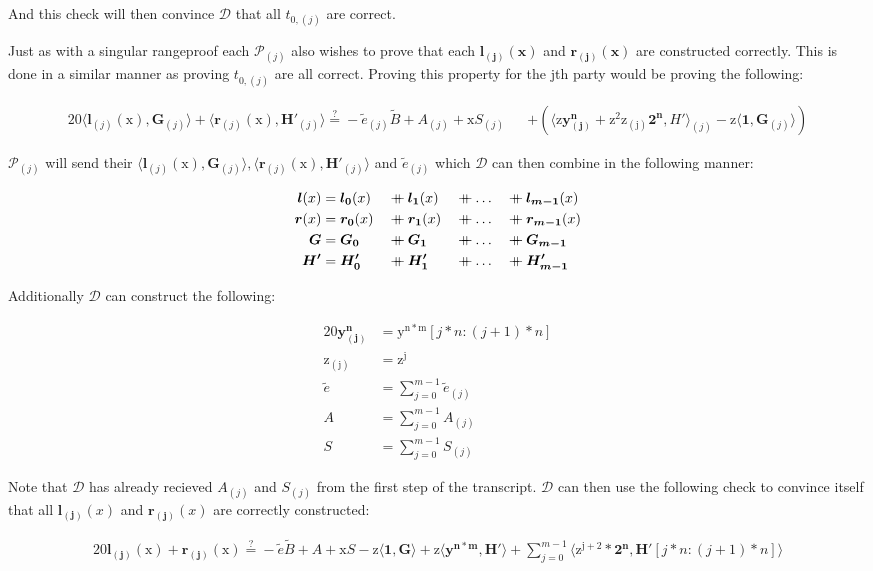 \documentclass{article}
\newcommand{\eq}[1]{\begin{alignat*}{20}#1\end{alignat*}}
\renewcommand{\vec}[1]{\boldsymbol{#1}}
\newcommand{\ran}[1]{\mathrm{#1}}
\newcommand{\vecran}[1]{\mathbf{#1}}
\renewcommand{\P}{\mathcal{P}}
\newcommand{\D}{\mathcal{D}}
\newcommand\concat{\mathbin{+\mkern-10mu+}} %
\newcommand{\dotp}[2]{\langle #1, #2 \rangle}
\begin{document}
And this check will then convince $\D$ that all $t_{0,(j)}$
are correct.

Just as with a singular rangeproof each $\P_{(j)}$ also wishes to prove
that each $\vec{l_{(j)}(x)}$ and $\vec{r_{(j)}(x)}$ are constructed
correctly. This is done in a similar manner as proving $t_{0,(j)}$
are all correct. Proving this property for the jth party would be
proving the following:

\eq{
	\dotp{\vec{l}_{(j)}(\ran{x})}{\vec{G}_{(j)}} + \dotp{\vec{r}_{(j)}(\ran{x})}{\vec{H'}_{(j)}} \stackrel{?}{=} -\widetilde{e}_{(j)}\widetilde{B} + A_{(j)} + \ran{x}S_{(j)} &&+ (\dotp{\ran{z}\vecran{y^n_{(j)}} + \ran{z^2}\ran{z_{(j)}}\vec{2^n}}{H'}_{(j)} - \ran{z}\dotp{\vec{1}}{\vec{G}_{(j)}})
}

$\P_{(j)}$ will send their $\dotp{\vec{l}_{(j)}(\ran{x})}{\vec{G}_{(j)}},
\dotp{\vec{r}_{(j)}(\ran{x})}{\vec{H'}_{(j)}}$ and $\widetilde{e}_{(j)}$
which $\D$ can then combine in the following manner:

\eq{
	\vec{l}(x) &= \vec{l_0}(x) &&\concat \vec{l_1}(x) &&\concat \dots &&\concat \vec{l_{m-1}}(x)\\
	\vec{r}(x) &= \vec{r_0}(x) &&\concat \vec{r_1}(x) &&\concat \dots &&\concat \vec{r_{m-1}}(x)\\
	\vec{G} &= \vec{G_0} &&\concat \vec{G_1} &&\concat \dots &&\concat \vec{G_{m-1}}\\
	\vec{H'} &= \vec{H'_0} &&\concat \vec{H'_1} &&\concat \dots &&\concat \vec{H'_{m-1}}
}

Additionally $\D$ can construct the following:

\eq{
	\vecran{y^n_{(j)}} &= \ran{y^{n*m}}[j*n : (j+1)*n]\\
	\ran{z_{(j)}} &= \ran{z^j}\\
	\widetilde{e} &= \sum^{m-1}_{j = 0} \widetilde{e}_{(j)}\\
	A &= \sum^{m-1}_{j = 0} A_{(j)}\\
	S &= \sum^{m-1}_{j = 0} S_{(j)}
}

Note that $\D$ has already recieved $A_{(j)}$ and $S_{(j)}$
from the first step of the transcript. $\D$ can then use the
following check to convince itself that all $\vec{l_{(j)}}(x)$ and
$\vec{r_{(j)}}(x)$ are correctly constructed:

\eq{
	\vec{l_{(j)}}(\ran{x}) + \vec{r_{(j)}}(\ran{x}) \stackrel{?}{=} -\widetilde{e}\widetilde{B} + A + \ran{x}S - \ran{z}\dotp{\vec{1}}{\vec{G}} + \ran{z}\dotp{\vecran{y^{n*m}}}{\vec{H'}} + \sum^{m-1}_{j = 0}\dotp{\ran{z^{j+2}}*\vec{2^n}}{\vec{H'}[j*n: (j+1)*n]}
}
\end{document}
